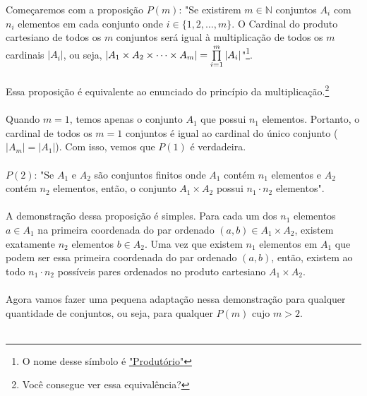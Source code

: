 \documentclass[main.tex]{subfiles}
\begin{document}
\begin{demonstration}

Começaremos com a proposição $P(m)$: "Se existirem $m \in \mathbb{N}$ conjuntos $A_i$ com $n_i$ elementos em cada conjunto onde $i \in \{1,2,\dots,m\}$. O Cardinal do produto cartesiano de todos os $m$ conjuntos será igual à multiplicação de todos os $m$ cardinais $| A_i|$, ou seja, $ |A_1 \times A_2 \times \dots \times A_m | = \prod_{i = 1}^{m}\limits | A_i | $"\footnote{O nome desse símbolo é \href{https://en.wikipedia.org/wiki/Multiplication\#Product_of_a_sequence}{"Produtório"}}.
\\~\\
Essa proposição é equivalente ao enunciado do princípio da multiplicação.\footnote{Você consegue ver essa equivalência?}
\\~\\
Quando $m = 1$, temos apenas o conjunto $A_1$ que possui $n_1$ elementos. Portanto, o cardinal de todos os $m = 1$ conjuntos é igual ao cardinal do único conjunto ($|A_m| = |A_1|$). Com isso, vemos que $P(1)$ é verdadeira.
\\~\\
$P(2)$: "Se $A_1$ e $A_2$ são conjuntos finitos onde $A_1$ contém $n_1$ elementos e $A_2$ contém $n_2$ elementos, então, o conjunto $A_1 \times A_2$ possui $n_1 \cdot n_2$ elementos".
\\~\\
A demonstração dessa proposição é simples. Para cada um dos $n_1$ elementos $a \in A_1$ na primeira coordenada do par ordenado $(a,b) \in A_1 \times A_2$, existem exatamente $n_2$ elementos $b \in A_2$. Uma vez que existem $n_1$ elementos em $A_1$ que podem ser essa primeira coordenada do par ordenado $(a,b)$, então, existem ao todo $n_1 \cdot n_2$ possíveis pares ordenados no produto cartesiano $A_1 \times A_2$.
\\~\\
Agora vamos fazer uma pequena adaptação nessa demonstração para qualquer quantidade de conjuntos, ou seja, para qualquer $P(m)$ cujo $m > 2$.
\\~\\

\end{demonstration}
\end{document}

